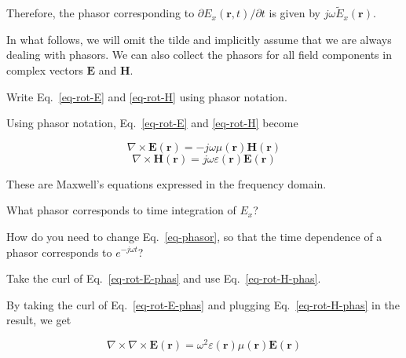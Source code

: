 Therefore, the phasor corresponding to $\partial E_x({\mathbf r},t) / \partial t$ is given by $j \omega \tilde{E}_x({\mathbf r})$.

In what follows, we will omit the tilde and implicitly assume that we are always dealing with phasors. We can also collect the phasors for all field components in complex vectors ${\mathbf E}$ and ${\mathbf H}$. 

\begin{cue}
Write Eq.~\ref{eq-rot-E} and \ref{eq-rot-H} using phasor notation.
\end{cue}

Using phasor notation, Eq.~\ref{eq-rot-E} and \ref{eq-rot-H} become

\begin{equation}
\nabla \times {\mathbf E}({\mathbf r}) = - j \omega \mu({\mathbf r}) {\mathbf H}({\mathbf r})
\label{eq-rot-E-phas}
\end{equation}
\begin{equation}   
\nabla \times {\mathbf H}({\mathbf r}) = j \omega \varepsilon({\mathbf r}) {\mathbf E}({\mathbf r}) \label{eq-rot-H-phas}
\end{equation}

These are Maxwell's equations expressed in the frequency domain.


\begin{exer}
  What phasor corresponds to time integration of $E_x$?
\end{exer}

\begin{exer}
How do you need to change Eq.~\ref{eq-phasor}, so that the time dependence of a phasor corresponds to $e^{-j \omega t}$? 
\end{exer}

\pagebreak


\begin{cue}
Take the curl of Eq.~\ref{eq-rot-E-phas} and use Eq.~\ref{eq-rot-H-phas}.
\end{cue}

By taking the curl of Eq.~\ref{eq-rot-E-phas} and plugging Eq.~\ref{eq-rot-H-phas} in the result, we get

\begin{equation}
  \nabla \times \nabla \times {\mathbf E}({\mathbf r}) = \omega^2 \varepsilon({\mathbf r}) \mu({\mathbf r}) {\mathbf E}({\mathbf r})
  \label{eq-helm-1}
\end{equation}

